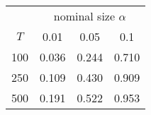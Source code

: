 % 
\begin{tabular}{cccc}
  \hline
  & \multicolumn{3}{c}{nominal size $\alpha$} \\
 $T$ & 0.01 & 0.05 & 0.1 \\
 \hline
100 & 0.036 & 0.244 & 0.710 \\ 
  250 & 0.109 & 0.430 & 0.909 \\ 
  500 & 0.191 & 0.522 & 0.953 \\ 
   \hline
\end{tabular}
